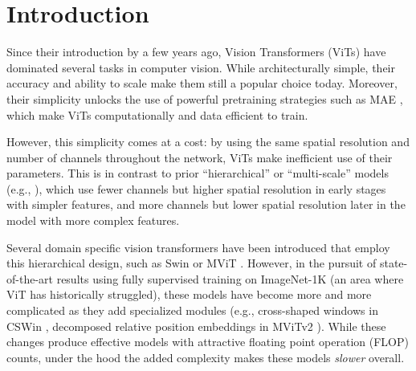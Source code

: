 \documentclass[nohyperref]{article}
\theoremstyle{plain}
\theoremstyle{definition}
\theoremstyle{remark}
\begin{document}
\section{Introduction}

Since their introduction by \citet{vit} a few years ago, Vision Transformers (ViTs) have dominated several tasks in computer vision. While architecturally simple, their accuracy \cite{deit3} and ability to scale \cite{scalingvits} make them still a popular choice today. 
Moreover, their simplicity unlocks the use of powerful pretraining strategies such as MAE \cite{mae}, which make ViTs computationally and data efficient to train.

However, this simplicity comes at a cost: by using the same spatial resolution and number of channels throughout the network, ViTs make inefficient use of their parameters. This is in contrast to prior ``hierarchical'' or ``multi-scale'' models (e.g., \citet{alexnet,resnet}), which use fewer channels but higher spatial resolution in early stages with simpler features, and more channels but lower spatial resolution later in the model with more complex features.

Several domain specific vision transformers have been introduced that employ this hierarchical design, such as Swin \cite{swin} or MViT \cite{mvitv1}. However, in the pursuit of state-of-the-art results using fully supervised training on ImageNet-1K (an area where ViT has historically struggled), these models have become more and more complicated as they add specialized modules (e.g., cross-shaped windows in CSWin \cite{cswin}, decomposed relative position embeddings in MViTv2 \cite{mvitv2}). While these changes produce effective models with attractive floating point operation (FLOP) counts, under the hood the added complexity makes these models \textit{slower} overall.
\end{document}
